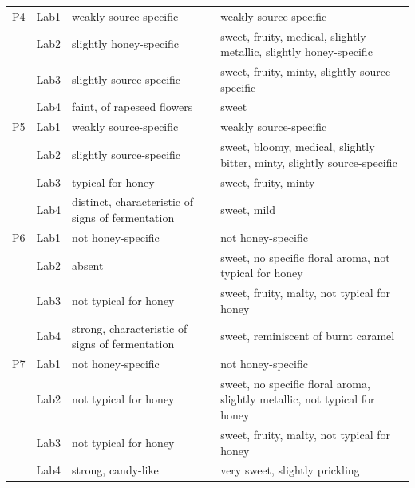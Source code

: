 {\begin{longtable}{@{}lc>{\raggedright\arraybackslash}p{5.2cm}>{\raggedright\arraybackslash}p{5.6cm}@{}}
\midrule
P4
 & Lab1 & weakly source-specific & weakly source-specific \\
 & Lab2 & slightly honey-specific & sweet, fruity, medical, slightly metallic, slightly honey-specific \\
 & Lab3 & slightly source-specific & sweet, fruity, minty, slightly source-specific \\
 & Lab4 & faint, of rapeseed flowers & sweet \\
\midrule
P5
 & Lab1 & weakly source-specific & weakly source-specific \\
 & Lab2 & slightly source-specific & sweet, bloomy, medical, slightly bitter, minty, slightly source-specific \\
 & Lab3 & typical for honey & sweet, fruity, minty \\
 & Lab4 & distinct, characteristic of signs of fermentation & sweet, mild \\
\midrule
P6
 & Lab1 & not honey-specific & not honey-specific \\
 & Lab2 & absent & sweet, no specific floral aroma, not typical for honey \\
 & Lab3 & not typical for honey & sweet, fruity, malty, not typical for honey \\
 & Lab4 & strong, characteristic of signs of fermentation & sweet, reminiscent of burnt caramel \\
\midrule
P7
 & Lab1 & not honey-specific & not honey-specific \\
 & Lab2 & not typical for honey & sweet, no specific floral aroma, slightly metallic, not typical for honey \\
 & Lab3 & not typical for honey & sweet, fruity, malty, not typical for honey \\
 & Lab4 & strong, candy-like & very sweet, slightly prickling \\
\end{longtable}
}
